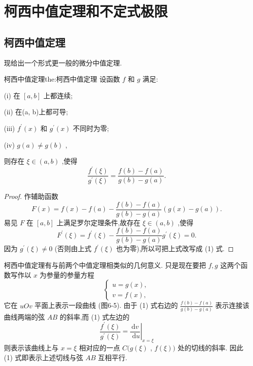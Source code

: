 \section{柯西中值定理和不定式极限}

\subsection{柯西中值定理}

现给出一个形式更一般的微分中值定理.

\begin{theorem}{柯西中值定理}{the:柯西中值定理}
设函数 \(f\) 和 \(g\) 满足:

(i) 在 \(\left\lbrack  {a,b}\right\rbrack\) 上都连续;

(ii) 在(a, b)上都可导;

(iii) \({f}^{\prime }\left( x\right)\) 和 \({g}^{\prime }\left( x\right)\) 不同时为零;

(iv) \(g\left( a\right)  \neq  g\left( b\right)\) ,

则存在 \(\xi  \in  \left( {a,b}\right)\) ,使得
\[
\frac{{f}^{\prime }\left( \xi \right) }{{g}^{\prime }\left( \xi \right) } = \frac{f\left( b\right)  - f\left( a\right) }{g\left( b\right)  - g\left( a\right) }. \tag{1}
\]
\end{theorem}

\begin{proof}
作辅助函数
\[
F\left( x\right)  = f\left( x\right)  - f\left( a\right)  - \frac{f\left( b\right)  - f\left( a\right) }{g\left( b\right)  - g\left( a\right) }\left( {g\left( x\right)  - g\left( a\right) }\right) .
\]
易见 \(F\) 在 \(\left\lbrack  {a,b}\right\rbrack\) 上满足罗尔定理条件,故存在 \(\xi  \in  \left( {a,b}\right)\) ,使得
\[
{F}^{\prime }\left( \xi \right)  = {f}^{\prime }\left( \xi \right)  - \frac{f\left( b\right)  - f\left( a\right) }{g\left( b\right)  - g\left( a\right) }{g}^{\prime }\left( \xi \right)  = 0.
\]
因为 \({g}^{\prime }\left( \xi \right)  \neq  0\) (否则由上式 \({f}^{\prime }\left( \xi \right)\) 也为零),所以可把上式改写成 (1) 式.
\end{proof}


柯西中值定理有与前两个中值定理相类似的几何意义. 只是现在要把 \(f,g\) 这两个函数写作以 \(x\) 为参量的参量方程
\[
\left\{  \begin{array}{l} u = g\left( x\right) , \\  v = f\left( x\right) , \end{array}\right.
\]
它在 \({uOv}\) 平面上表示一段曲线 (图6-5). 由于 (1) 式右边的 \(\frac{f\left( b\right)  - f\left( a\right) }{g\left( b\right)  - g\left( a\right) }\) 表示连接该曲线两端的弦 \({AB}\) 的斜率,而 (1) 式左边的
\[
\frac{{f}^{\prime }\left( \xi \right) }{{g}^{\prime }\left( \xi \right) } = {\left. \frac{\mathrm{d}v}{\mathrm{\;d}u}\right| }_{x = \xi }
\]
则表示该曲线上与 \(x = \xi\) 相对应的一点 \(C(g\left( \xi \right)\) , \(f\left( \xi \right) )\) 处的切线的斜率. 因此 (1) 式即表示上述切线与弦 \({AB}\) 互相平行.


